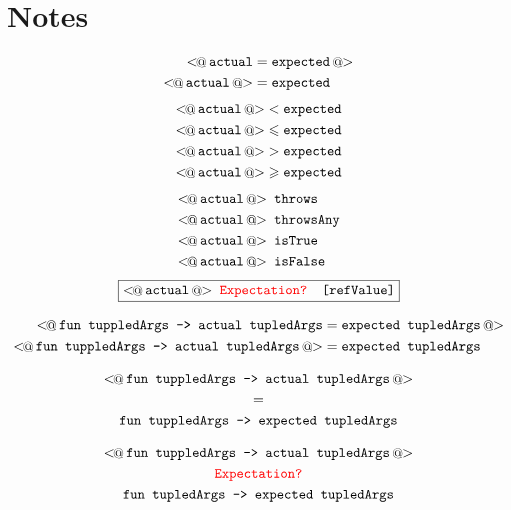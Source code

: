 \documentclass[
	bibliography=totoc,
	listof=totoc,
]{scrbook}
\begin{document}
\vfill\pagebreak
\mainmatter %
\chapter*{Notes} %

\begin{align*}
    \Lq\texttt{actual} &= \texttt{expected}\Rq\\
    \Lq\texttt{actual}\Rq &= \texttt{expected}
\end{align*}
\begin{align*}
    \Lq\texttt{actual}\Rq &< \texttt{expected}\\
    \Lq\texttt{actual}\Rq &\leqslant \texttt{expected}\\
    \Lq\texttt{actual}\Rq &> \texttt{expected}\\
    \Lq\texttt{actual}\Rq &\geqslant \texttt{expected}
\end{align*}
\begin{align*}
    \Lq\texttt{actual}\Rq &\texttt{ throws}\\
    \Lq\texttt{actual}\Rq &\texttt{ throwsAny}\\
    \Lq\texttt{actual}\Rq &\texttt{ isTrue}\\
    \Lq\texttt{actual}\Rq &\texttt{ isFalse}
\end{align*}
\[\boxed{
    \Lq\texttt{actual}\Rq \texttt{ \textcolor{red}{Expectation?} [refValue]}
}\]

\vfill
\begin{align*}
    \Lq\texttt{fun tuppledArgs -> actual tupledArgs} &= \texttt{expected tupledArgs}\Rq\\
    \Lq\texttt{fun tuppledArgs -> actual tupledArgs}\Rq &= \texttt{expected tupledArgs}
\end{align*}

\begin{gather*}
    \Lq \texttt{fun tuppledArgs -> actual tupledArgs}\Rq\\
    =\\
    \texttt{fun tuppledArgs -> expected tupledArgs}
\end{gather*}

\begin{gather*}
        \Lq \texttt{fun tuppledArgs -> actual tupledArgs}\Rq\\
        \texttt{\textcolor{red}{Expectation?}}\\
        \texttt{fun tupledArgs -> expected tupledArgs}
\end{gather*}%
\end{document}
